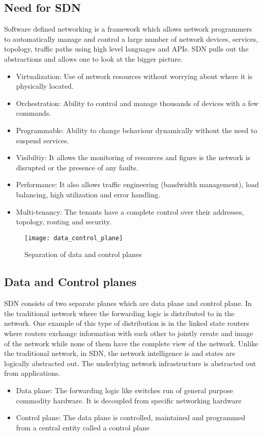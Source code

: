 \subsection{Need for SDN}
Software defined networking is a framework which allows network programmers to automatically manage and control a large number of network devices, services, topology, traffic paths using high level languages and APIs. SDN pulls out the abstractions and allows one to look at the bigger picture. 
\begin{itemize}
    \item Virtualization: Use of network resources without worrying about where it is physically located.
    \item Orchestration: Ability to control and manage thousands of devices with a few commands.
    \item Programmable: Ability to change behaviour dynamically without the need to suspend services.
    \item Visibiltiy: It allows the monitoring of resources and figure is the network is disrupted or the presence of any faults.
    \item Performance: It also allows traffic engineering (bandwidth management), load balancing, high utilization and error handling.
    \item Multi-tenancy: The tenants have a complete control over their addresses, topology, routing and security.
\end{itemize}

\begin{figure}[h]
\begin{center}	
\texttt{[image: data\_control\_plane]} 
\caption{Separation of data and control planes }
\label{fig:data_control_plane}
\end{center}
\end{figure}

\subsection{Data and Control planes}
SDN consists of two separate planes which are data plane and control plane. In the traditional network where the forwarding logic is distributed to in the network. One example of this type of distribution is in the linked state routers where routers exchange information with each other to jointly create and image of the network while none of them have the complete view of the network. Unlike the traditional network, in SDN, the network intelligence is and states are logically abstracted out. The underlying network infrastructure is abstracted out from applications.
\begin{itemize}
    \item Data plane: The forwarding logic like switches run of general purpose commodity hardware. It is decoupled from specific networking hardware
    \item Control plane: The data plane is controlled, maintained and programmed from a central entity called a control plane 
\end{itemize}

